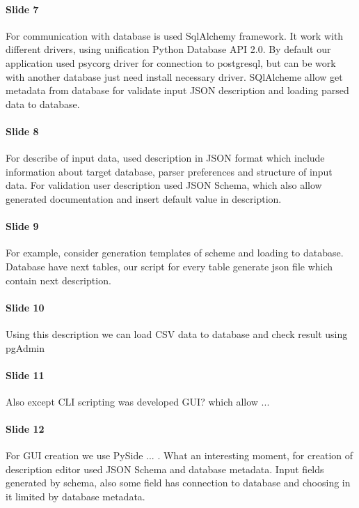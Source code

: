 \documentclass[]{article}
\begin{document}
\paragraph{Slide 7} For communication with database is used SqlAlchemy framework. It work with different drivers, using unification Python Database API 2.0. By default our application used psycorg driver for connection to postgresql, but can be work with another database just need install necessary driver. SQlAlcheme allow get metadata from database for validate input JSON description and loading parsed data to database.

\paragraph{Slide 8} For describe of input data, used description in JSON format which include information about target database, parser preferences and structure of input data. For validation user description used JSON Schema, which also  allow generated documentation and insert default value in description.

\paragraph{Slide 9} For example, consider generation templates of scheme and loading  to database. Database have next tables, our script for every table generate json file which contain next description.

\paragraph{Slide 10} Using this description we can load CSV data to database and check result using pgAdmin

\paragraph{Slide 11} Also except CLI scripting was developed GUI? which allow ...

\paragraph{Slide 12} For GUI creation we use PySide ... . 
 What an interesting moment, for creation of description editor used JSON Schema and database metadata. Input fields generated by schema, also some field has connection to database and choosing in it limited by database metadata.
\end{document}

